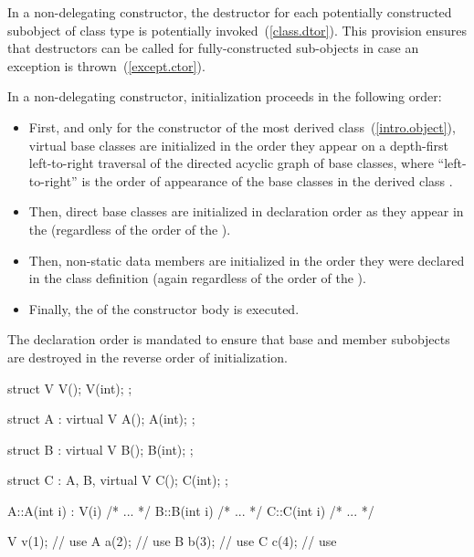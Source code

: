 \pnum
In a non-delegating constructor, the destructor for each potentially constructed
subobject of class type is potentially invoked~(\ref{class.dtor}).
\enternote This provision ensures that destructors can be called for fully-constructed
sub-objects in case an exception is thrown~(\ref{except.ctor}). \exitnote

\pnum
In a non-delegating constructor, initialization
proceeds in the following order:

\begin{itemize}
\item
{}%
First, and only for the constructor of the most derived class~(\ref{intro.object}),
virtual base classes are initialized in the order they appear on a
depth-first left-to-right traversal of the directed acyclic graph of
base classes,
where ``left-to-right'' is the order of appearance of the base classes
in the derived class
.
\item
{}%
Then, direct base classes are initialized in declaration order
as they appear in the
(regardless of the order of the
).
\item
{}%
Then, non-static data members are initialized in the order
they were declared in the class definition
(again regardless of the order of the
).
\item
Finally, the  of the constructor
body  is executed.
\end{itemize}

\enternote
The declaration order is mandated to ensure that base and member
subobjects are destroyed in the reverse order of initialization.
\exitnote

\pnum
\enterexample
\begin{codeblock}
struct V {
  V();
  V(int);
};

struct A : virtual V {
  A();
  A(int);
};

struct B : virtual V {
  B();
  B(int);
};

struct C : A, B, virtual V {
  C();
  C(int);
};

A::A(int i) : V(i) { /* ... */ }
B::B(int i) { /* ... */ }
C::C(int i) { /* ... */ }

V v(1);             // use 
A a(2);             // use 
B b(3);             // use 
C c(4);             // use 
\end{codeblock}
\exitexample


